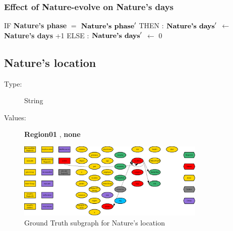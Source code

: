 \documentclass{article}%
\begin{document}
%
\subsubsection{Effect of Nature{-}evolve on Nature's days}%
\label{ssubsec:Effect of Nature{-}evolve on Nature's days}%
\begin{flushleft}%
IF %
\textbf{Nature's phase}%
$=$%
$\mbox{\textbf{Nature's phase}} '$%
\linebreak%
\hspace*{2em}%
THEN %
: %
$\mbox{\textbf{Nature's days}} '$%
$\leftarrow$%
\textbf{Nature's days}%
+1%
\linebreak%
\hspace*{2em}%
ELSE %
: %
$\mbox{\textbf{Nature's days}} '$%
$\leftarrow$%
0%
\end{flushleft}

%
\subsection{Nature's location}%
\label{subsec:Nature's location}%
\begin{description}%
\item[Type:]%
String%
\item[Values:]%
\textbf{Region01}%
, %
\textbf{none}%
\end{description}%


\begin{figure}[ht]%
\centering%
\includegraphics[width=0.8\textwidth]{images/locationOfNature.png}%
\caption{Ground Truth subgraph for Nature's location}%
\end{figure}

%
\end{document}
